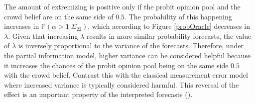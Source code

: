 \documentclass[11pt]{article}
\renewcommand{\P}{\mathbb{P}}
\theoremstyle{definition}
\theoremstyle{definition}
\begin{document}
The amount of extremizing is positive only if the probit opinion pool and the crowd belief are on the same side of $0.5$. The probability of this happening increases in $\P(\alpha > 1 | \Sigma_{22})$, which according to Figure \ref{probOracle} decreases in $\lambda$. Given that increasing $\lambda$ results in more similar probability forecasts, the value of $\lambda$ is inversely proportional to the variance of the forecasts. Therefore,  under the partial information model, higher variance can be considered helpful because it increases the chances of the probit opinion pool being on the same side $0.5$ with the crowd belief. Contrast this with the classical measurement error model where increased variance is typically considered harmful. This reversal of the effect is an important property of the interpreted forecasts (\cite{hong2009interpreted}). 

\end{document}
